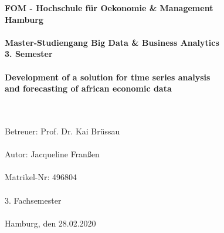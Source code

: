 		\begin{titlepage}
			\begin{center}
			\setlength{\headheight}{1.5\baselineskip}
			\renewcommand{\baselinestretch}{1.5}
					\textbf{\large FOM - Hochschule für Oekonomie \& Management \\
						Hamburg \\
						\ \\
						Master-Studiengang Big Data \& Business Analytics \\
						3. Semester \\
						\ \\
						Development of a solution for time series analysis \\
						and forecasting of african economic data \\
						\ \\
						}
						
					\textrm{
						\ \\
						Betreuer: Prof. Dr. Kai Brüssau \\
						\ \\
						Autor: Jacqueline Franßen \\
						\ \\
						Matrikel-Nr: 496804 \\
						\ \\
						3. Fachsemester \\
						\ \\
						Hamburg, den 28.02.2020 \\
						}
			\end{center}
		\end{titlepage}

%

			\setcounter{tocdepth}{3}
			\setcounter{secnumdepth}{3}		
			\thispagestyle{empty}
			\tableofcontents
			\newpage
			\listoffigures
			\listoftables

			\thispagestyle{empty}